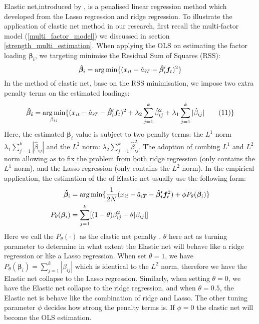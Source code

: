 Elastic net,introduced by ,  is a penalised linear regression method which developed from the Lasso regression \cite{Tibshirani1996} and ridge regression.
To illustrate the application of elastic net method in our research, first recall the multi-factor model (\ref{multi_factor_model}) we discussed in section \ref{strength_multi_estimation}.
When applying the OLS on estimating the factor loading $\bm{\beta_{i}}$, we targeting minimise the Residual Sum of Squares (RSS):
\[  \bm{\hat{\beta}}_i =   \operatorname*{arg\,min}\{  (x_{it} - \hat{a}_{iT} - \bm{\hat{\beta}}_i^{\prime}\bm{f}_t )^2 \}    \]
In the method of elastic net, base on the RSS minimisation, we impose two extra penalty terms on the estimated loadings:
\[   \bm{\hat{\beta}_{i}}  = \operatorname*{arg\,min}_{\beta_{ij}}\{ (x_{it} - \hat{a}_{iT} - \bm{\hat{\beta}}_{i} ^{\prime}\bm{f}_{t})^2 + \lambda_2\sum_{j = 1}^k\hat{\beta}_{ij}^2  + \lambda_1\sum_{j=1}^k|\hat{\beta}_{ij}|  \label{ENcriterion} \tag{11}   \}    \]
Here, the estimated $\bm{\beta}_i$ value is subject to two penalty terms: the $L^1$ norm $\lambda_1\sum_{j=1}^k|\hat{\beta}_{ij}|$ and the $L^2$ norm: $\lambda_2\sum_{j = 1}^k\hat{\beta}_{ij}^2$.
The adoption of combing $L^1$ and $L^2$ norm allowing as to fix the problem from both ridge regression (only contains the $L^1$ norm), and the Lasso regression (only contains the $L^2$ norm).
In the empirical application, the estimation of the of Elastic net usually use the following form:
\begin{align*}
	\bm{\hat{\beta}}_{i} &= \operatorname*{arg\,min}\{ \frac{1}{2N} (x_{it}-\hat{a}_{iT} - \bm{\hat{\beta}_{i}^{\prime}}\bm{f}_t ^2 ) +\phi P_{\theta}(\bm{\beta}_i)  \}\\
	P_{\theta}(\bm{\beta}_i) &=\sum_{j=1}^k [ (1-\theta)\beta_{ij}^2 + \theta |\beta_{ij}|]
\end{align*}
Here we call the $P_{\theta}(\cdot)$ as the elastic net penalty \cite{Friedman2010}.
$\theta$ here act as turning parameter to determine in what extent the Elastic net will behave like a ridge regression or like a Lasso regression.
When set $\theta = 1$, we have $P_{\theta}(\bm{\beta}_i) =\sum_{j=1}^k  |\beta_{ij}|$ which is identical to the $L^2$ norm, therefore we have the Elastic net collapse to the Lasso regression.
Similarly, when setting $\theta = 0$, we have the Elastic net collapse to the ridge regression, and when $\theta = 0.5$, the Elastic net is behave like the combination of ridge and Lasso.
The other tuning parameter $\phi$ decides how strong the penalty terms is.
If $\phi = 0$ the elastic net will become the OLS estimation.

